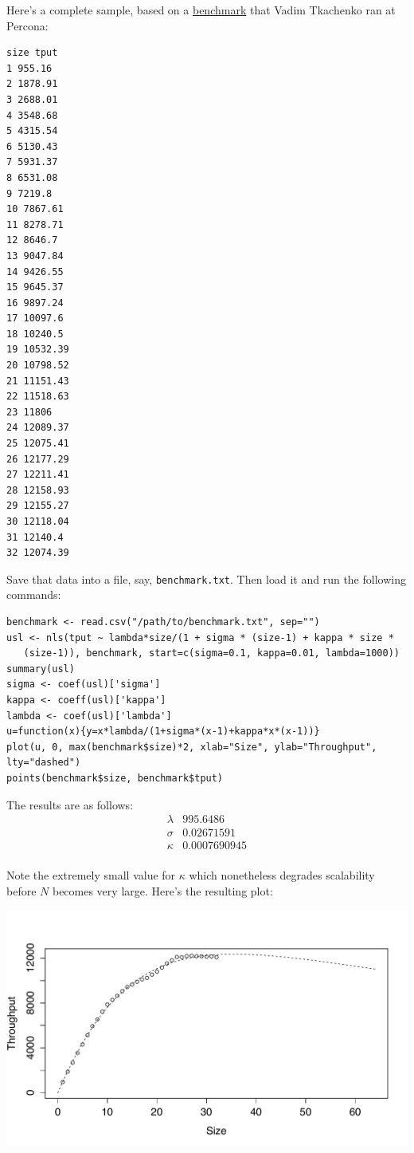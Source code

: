 \documentclass{vivid_layout}
\begin{document}
Here's a complete sample, based on a
\href{https://www.percona.com/docs/wiki/benchmark:cisco:scale:start}{benchmark}
that Vadim Tkachenko ran at Percona:

\begin{verbatim}
size tput
1 955.16
2 1878.91
3 2688.01
4 3548.68
5 4315.54
6 5130.43
7 5931.37
8 6531.08
9 7219.8
10 7867.61
11 8278.71
12 8646.7
13 9047.84
14 9426.55
15 9645.37
16 9897.24
17 10097.6
18 10240.5
19 10532.39
20 10798.52
21 11151.43
22 11518.63
23 11806
24 12089.37
25 12075.41
26 12177.29
27 12211.41
28 12158.93
29 12155.27
30 12118.04
31 12140.4
32 12074.39
\end{verbatim}

Save that data into a file, say, \texttt{benchmark.txt}. Then load it and run the following commands:

\begin{verbatim}
benchmark <- read.csv("/path/to/benchmark.txt", sep="")
usl <- nls(tput ~ lambda*size/(1 + sigma * (size-1) + kappa * size *
   (size-1)), benchmark, start=c(sigma=0.1, kappa=0.01, lambda=1000))
summary(usl)
sigma <- coef(usl)['sigma']
kappa <- coeff(usl)['kappa']
lambda <- coef(usl)['lambda']
u=function(x){y=x*lambda/(1+sigma*(x-1)+kappa*x*(x-1))}
plot(u, 0, max(benchmark$size)*2, xlab="Size", ylab="Throughput", lty="dashed")
points(benchmark$size, benchmark$tput)
\end{verbatim}

The results are as follows:
\[
\begin{array}{ll}
			\lambda&995.6486 \\
     \sigma & 0.02671591 \\
			       \kappa & 0.0007690945 \\
\end{array}
\]

Note the extremely small value for $\kappa$ which nonetheless degrades
scalability before $N$ becomes very large. Here's the resulting plot:
\begin{center}
\includegraphics[width=.85\linewidth]{scalability/cisco}
\end{center}
\end{document}
